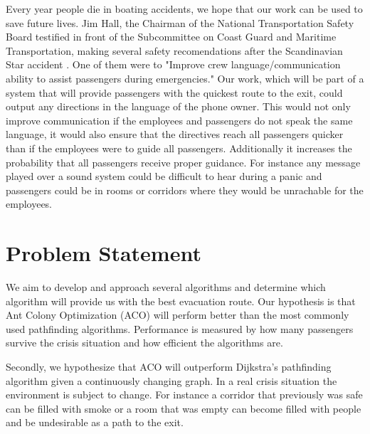 Every year people die in boating accidents, we hope that our work can be                                                                         
used to save future lives. Jim Hall, the Chairman of the National Transportation 
Safety Board testified in front of the Subcommittee on Coast Guard and Maritime 
Transportation, making several safety recomendations after the Scandinavian Star
accident \cite{ntsb}. One of them were to "Improve crew language/communication 
ability to assist passengers during emergencies." Our work, which will be part of a system
that will provide passengers with the quickest route to the exit, could output 
any directions in the language of the phone owner. This would not only improve 
communication if the employees and passengers do not speak the same language, 
it would also ensure that the directives reach all passengers quicker than if the employees 
were to guide all passengers. Additionally it increases the probability that all passengers 
receive proper guidance. For instance any message played over a sound system could be
difficult to hear during a panic and passengers could be in rooms or corridors
where they would be unrachable for the employees.



\section{Problem Statement}

We aim to develop and approach several algorithms and determine which algorithm will provide us with the         
best evacuation route. Our hypothesis is that Ant Colony Optimization (ACO) will perform better than the 
most commonly used pathfinding algorithms. Performance is measured by how many passengers 
survive the crisis situation and how efficient the algorithms are. 

Secondly, we hypothesize that ACO will outperform Dijkstra's pathfinding algorithm       
given a continuously changing graph. In a real crisis situation the environment is subject
to change. For instance a corridor that previously was safe can be filled with smoke
or a room that was empty can become filled with people and be undesirable as a path
to the exit.

